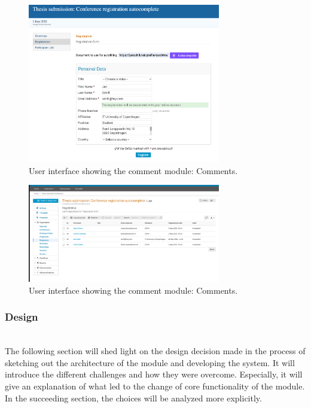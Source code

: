 \begin{figure}[ht!]
    \centering
    \includegraphics[width=0.75\textwidth]{prototype/graphs/poc-autocomplete-conference-registration.png}
    \caption{User interface showing the comment module: Comments.}
    \label{fig:poc-autocomplete-conference-registration}
\end{figure}

\begin{figure}[ht!]
    \centering
    \includegraphics[width=0.75\textwidth]{prototype/poc-solid-autocomplete-conference-registration-attendees.png}
    \caption{User interface showing the comment module: Comments.}
    \label{fig:poc-autocomplete-conference-registration-submitted}
\end{figure}

\subsubsection{Design}\label{poc2:design}\mbox{}\\

The following section will shed light on the design decision made in the process of sketching out the architecture of the module and developing the system. It will introduce the different challenges and how they were overcome. Especially, it will give an explanation of what led to the change of core functionality of the module. In the succeeding section, the choices will be analyzed more explicitly.
\vspace{0.5cm}
